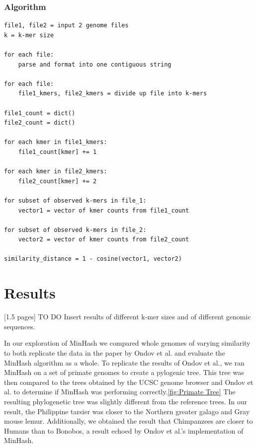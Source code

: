 \documentclass[12pt, letterpaper]{article}
\begin{document}
\subsubsection{Algorithm}
\begin{verbatim}
file1, file2 = input 2 genome files 
k = k-mer size

for each file:
    parse and format into one contiguous string

for each file:
    file1_kmers, file2_kmers = divide up file into k-mers

file1_count = dict()
file2_count = dict()

for each kmer in file1_kmers:
    file1_count[kmer] += 1

for each kmer in file2_kmers:
    file2_count[kmer] += 2

for subset of observed k-mers in file_1:
    vector1 = vector of kmer counts from file1_count

for subset of observed k-mers in file_2:
    vector2 = vector of kmer counts from file2_count

similarity_distance = 1 - cosine(vector1, vector2)
\end{verbatim}

\section{Results}
[1.5 pages] \color{red} TO DO \color{black} Insert results of different k-mer sizes and of different genomic sequences.

In our exploration of MinHash we compared whole genomes of varying similarity to both replicate the data in the paper by Ondov et al. and evaluate the MinHash algorithm as a whole. To replicate the results of Ondov et al., we ran MinHash on a set of primate genomes to create a pylogenic tree. This tree was then compared to the trees obtained by the UCSC genome browser and Ondov et al. to determine if MinHash was performing correctly.\ref{fig:Primate Tree} The resulting phylogenetic tree was slightly different from the reference trees. In our result, the Philippine tarsier was closer to the Northern greater galago and Gray mouse lemur. Additionally, we obtained the result that Chimpanzees are closer to Humans than to Bonobos, a result echoed by Ondov et al.'s implementation of MinHash.
\end{document}
